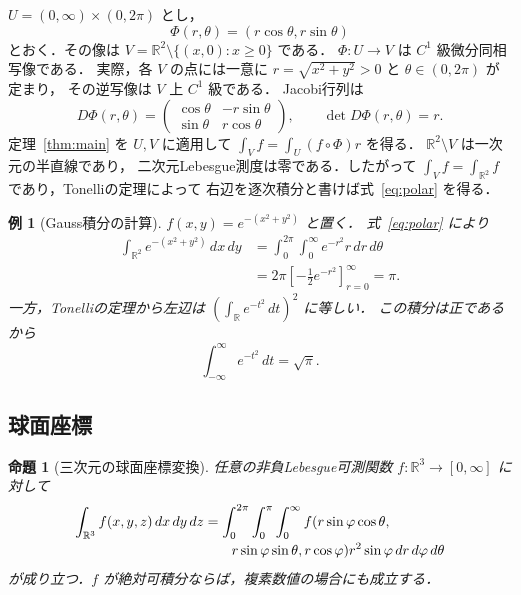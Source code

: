 \documentclass[a5paper,10pt,onecolumn]{jsarticle}
\makeatletter
\theoremstyle{mathnotetheorem}
\newtheorem{proposition}[theorem]{命題}
\newtheorem{example}[theorem]{例}
\renewcommand{\proofname}{証明}
\renewenvironment{proof}[1][\proofname]{%
  \par\pushQED{\qed}\normalfont\topsep4\p@\@plus2\p@\relax
  \trivlist\item[\hskip\labelsep\bfseries #1]\ignorespaces
}{\popQED\endtrivlist\@endpefalse}
\newcommand{\R}{\mathbb{R}}
\makeatother
\begin{document}
\begin{proof}
$U=(0,\infty)\times(0,2\pi)$ とし，
\[
 \Phi(r,\theta)=(r\cos\theta,r\sin\theta)
\]
とおく．その像は
$V=\R^2\setminus\{(x,0):x\ge0\}$ である．
$\Phi:U\to V$ は $C^1$ 級微分同相写像である．
実際，各 $V$ の点には一意に
$r=\sqrt{x^2+y^2}>0$ と $\theta\in(0,2\pi)$ が定まり，
その逆写像は $V$ 上 $C^1$ 級である．
Jacobi行列は
\[
 D\Phi(r,\theta)
 =\begin{pmatrix}
   \cos\theta&-r\sin\theta\\
   \sin\theta&r\cos\theta
  \end{pmatrix},
 \qquad\det D\Phi(r,\theta)=r.
\]
定理~\ref{thm:main} を $U,V$ に適用して
$\int_Vf=\int_U(f\circ\Phi)r$ を得る．
$\R^2\setminus V$ は一次元の半直線であり，
二次元Lebesgue測度は零である．したがって
$\int_Vf=\int_{\R^2}f$ であり，Tonelliの定理によって
右辺を逐次積分と書けば式~\eqref{eq:polar} を得る．
\end{proof}

\begin{example}[Gauss積分の計算]\label{ex:gauss}
$f(x,y)=e^{-(x^2+y^2)}$ と置く．
式~\eqref{eq:polar} により
\begin{align*}
 \int_{\R^2}e^{-(x^2+y^2)}\,dx\,dy
 &=\int_0^{2\pi}\int_0^\infty e^{-r^2}r\,dr\,d\theta\\
 &=2\pi\left[-\frac12 e^{-r^2}\right]_{r=0}^{\infty}=\pi.
\end{align*}
一方，Tonelliの定理から左辺は
$(\int_{\R}e^{-t^2}\,dt)^2$ に等しい．
この積分は正であるから
\[
 \int_{-\infty}^{\infty}e^{-t^2}\,dt=\sqrt\pi.
\]
\end{example}

\subsection{球面座標}

\begin{proposition}[三次元の球面座標変換]\label{prop:spherical}
任意の非負Lebesgue可測関数 $f:\R^3\to[0,\infty]$ に対して
\begin{align}\label{eq:spherical}
 \int_{\R^3}f(x,y,z)\,dx\,dy\,dz
 &=\int_0^{2\pi}\int_0^\pi\int_0^\infty
 f(r\sin\varphi\cos\theta,\notag\\[-1pt]
 &\qquad r\sin\varphi\sin\theta,r\cos\varphi)
 r^2\sin\varphi\,dr\,d\varphi\,d\theta
\end{align}
が成り立つ．$f$ が絶対可積分ならば，複素数値の場合にも成立する．
\end{proposition}
\end{document}
